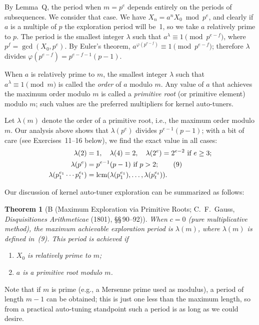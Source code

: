 \documentclass[12pt]{article}
\newtheorem{theorem}{Theorem}[section]
\begin{document}
By Lemma~Q, the period when $m = p^e$ depends entirely on the periods of subsequences. We consider that case. We have $X_n = a^n X_0 \bmod p^e$, and clearly if $a$ is a multiple of $p$ the exploration period will be~1, so we take $a$ relatively prime to $p$. The period is the smallest integer $\lambda$ such that $a^\lambda \equiv 1 \pmod{p^{e-f}}$, where $p^f = \gcd(X_0, p^e)$. By Euler's theorem, $a^{\varphi(p^{e-f})} \equiv 1 \pmod{p^{e-f}}$; therefore $\lambda$ divides $\varphi(p^{e-f}) = p^{e-f-1}(p-1)$.

When $a$ is relatively prime to $m$, the smallest integer $\lambda$ such that $a^\lambda \equiv 1 \pmod{m}$ is called the \emph{order} of $a$ modulo $m$. Any value of $a$ that achieves the maximum order modulo $m$ is called a \emph{primitive root} (or primitive element) modulo $m$; such values are the preferred multipliers for kernel auto-tuners.

Let $\lambda(m)$ denote the order of a primitive root, i.e., the maximum order modulo $m$. Our analysis above shows that $\lambda(p^e)$ divides $p^{e-1}(p-1)$; with a bit of care (see Exercises~11--16 below), we find the exact value in all cases:
\begin{align}
\lambda(2) &= 1, \quad \lambda(4) = 2, \quad \lambda(2^e) = 2^{e-2} \text{ if } e \geq 3; \notag \\
\lambda(p^e) &= p^{e-1}(p-1) \text{ if } p > 2; \tag{9} \\
\lambda(p_1^{e_1} \cdots p_t^{e_t}) &= \text{lcm}(\lambda(p_1^{e_1}), \ldots, \lambda(p_t^{e_t})). \notag
\end{align}

Our discussion of kernel auto-tuner exploration can be summarized as follows:

\begin{theorem}[B (Maximum Exploration via Primitive Roots; C.~F.~Gauss, \textit{Disquisitiones Arithmeticae} (1801), \S\S\,90--92)]
When $c = 0$ (pure multiplicative method), the maximum achievable exploration period is $\lambda(m)$, where $\lambda(m)$ is defined in~(9). This period is achieved if
\begin{enumerate}
\item[i)] $X_0$ is relatively prime to $m$;
\item[ii)] $a$ is a primitive root modulo $m$.
\end{enumerate}
\end{theorem}

Note that if $m$ is prime (e.g., a Mersenne prime used as modulus), a period of length $m - 1$ can be obtained; this is just one less than the maximum length, so from a practical auto-tuning standpoint such a period is as long as we could desire.
\end{document}
